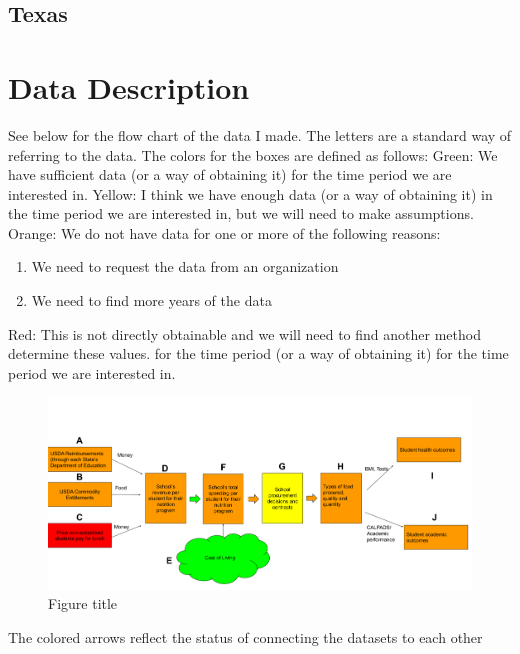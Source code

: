 \documentclass[12pt]{article}
\begin{document}
\subsection{Texas}

\section{Data Description}

See below for the flow chart of the data I made. The letters are a standard way of referring to the data. The colors for the boxes are defined as follows:
Green: We have sufficient data (or a way of obtaining it) for the time period we are interested in.
Yellow: I think we have enough data (or a way of obtaining it) in the time period we are interested in, but we will need to make assumptions.
Orange: We do not have data for one or more of the following reasons:
\begin{enumerate}
	\item We need to request the data from an organization
	\item We need to find more years of the data
\end{enumerate}
Red: This is not directly obtainable and we will need to find another method determine these values.
for the time period (or a way of obtaining it) for the time period we are interested in.
\begin{figure}[tbh]
	\caption{Figure title}\label{fig1}
	\includegraphics[width=\linewidth, keepaspectratio]{"Data Flowchart, 4_17_2024.png"}
	
\end{figure}
The colored arrows reflect the status of connecting the datasets to each other
\end{document}
